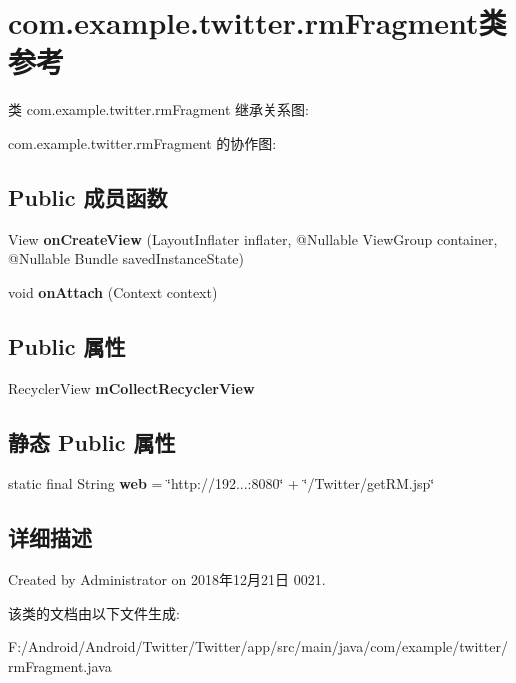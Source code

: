 \hypertarget{classcom_1_1example_1_1twitter_1_1rm_fragment}{}\section{com.\+example.\+twitter.\+rm\+Fragment类 参考}
\label{classcom_1_1example_1_1twitter_1_1rm_fragment}


类 com.\+example.\+twitter.\+rm\+Fragment 继承关系图\+:


com.\+example.\+twitter.\+rm\+Fragment 的协作图\+:
\subsection*{Public 成员函数}
\begin{DoxyCompactItemize}
\item 
\mbox{\label{classcom_1_1example_1_1twitter_1_1rm_fragment_abce83f3cc2eba74644871fd643d515d9}} 
View {\bfseries on\+Create\+View} (Layout\+Inflater inflater, @Nullable View\+Group container, @Nullable Bundle saved\+Instance\+State)
\item 
\mbox{\label{classcom_1_1example_1_1twitter_1_1rm_fragment_a51902532922cd20ed1c58731ac4bdae3}} 
void {\bfseries on\+Attach} (Context context)
\end{DoxyCompactItemize}
\subsection*{Public 属性}
\begin{DoxyCompactItemize}
\item 
\mbox{\label{classcom_1_1example_1_1twitter_1_1rm_fragment_a130c8d6910a4939dc42a22fdc58fe678}} 
Recycler\+View {\bfseries m\+Collect\+Recycler\+View}
\end{DoxyCompactItemize}
\subsection*{静态 Public 属性}
\begin{DoxyCompactItemize}
\item 
\mbox{\label{classcom_1_1example_1_1twitter_1_1rm_fragment_a3a4294c1e47168e5bfbfa9fa59406ff2}} 
static final String {\bfseries web} = \char`\"{}http\+://192...\+:8080\char`\"{} + \char`\"{}/Twitter/get\+R\+M.\+jsp\char`\"{}
\end{DoxyCompactItemize}


\subsection{详细描述}
Created by Administrator on 2018年12月21日 0021. 

该类的文档由以下文件生成\+:\begin{DoxyCompactItemize}
\item 
F\+:/\+Android/\+Android/\+Twitter/\+Twitter/app/src/main/java/com/example/twitter/rm\+Fragment.\+java\end{DoxyCompactItemize}
